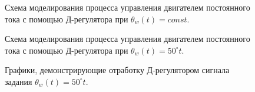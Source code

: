 \documentclass[12pt,a4paper,openany]{extarticle}
\begin{document}
\begin{landscape}
\thispagestyle{empty}
\begin{figure}[h!]
	\caption{Схема моделирования процесса управления двигателем постоянного тока с помощью Д-регулятора при $\theta_w(t) = const$.}
	\label{fig:D_regulator}
\end{figure}	

\begin{figure}[h!]
	\caption{Схема моделирования процесса управления двигателем постоянного тока с помощью Д-регулятора при $\theta_w(t) = 50^\circ t$.}
	\label{fig:D_regulator_linear_g}
\end{figure}	

\end{landscape}

\begin{figure}[h!]
	\vspace{-1cm}
	\caption{Графики, демонстрирующие отработку Д-регулятором сигнала задания $\theta_w(t) = 50^\circ t$.}
	\label{fig:D_regul_linear_g_graphs}
\end{figure}
\end{document}
